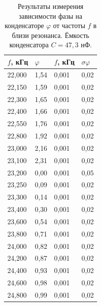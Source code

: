 \documentclass[12pt]{article}
\begin{document}
\begin{table}[H]
    \centering
    \begin{tabular}{|l|l|l|l|}
        \hline
        $f$, кГц & $\varphi$ & $f$, кГц & $\sigma \varphi$ \\ \hline
        22,000   & 1,54      & 0,001    & 0,02             \\ \hline
        22,150   & 1,59      & 0,001    & 0,02             \\ \hline
        22,300   & 1,65      & 0,001    & 0,02             \\ \hline
        22,400   & 1,66      & 0,001    & 0,02             \\ \hline
        22,550   & 1,76      & 0,001    & 0,02             \\ \hline
        22,800   & 1,92      & 0,001    & 0,02             \\ \hline
        23,000   & 2,16      & 0,001    & 0,02             \\ \hline
        23,100   & 2,31      & 0,001    & 0,02             \\ \hline
        23,200   & 0,00      & 0,001    & 0,05             \\ \hline
        23,250   & 0,09      & 0,001    & 0,02             \\ \hline
        23,300   & 0,14      & 0,001    & 0,02             \\ \hline
        23,400   & 0,30      & 0,001    & 0,02             \\ \hline
        23,600   & 0,54      & 0,001    & 0,02             \\ \hline
        23,800   & 0,71      & 0,001    & 0,02             \\ \hline
        24,000   & 0,82      & 0,001    & 0,02             \\ \hline
        24,200   & 0,87      & 0,001    & 0,02             \\ \hline
        24,400   & 0,93      & 0,001    & 0,02             \\ \hline
        24,600   & 0,98      & 0,001    & 0,02             \\ \hline
        24,800   & 0,99      & 0,001    & 0,02             \\ \hline
    \end{tabular}
    \caption{Результаты измерения зависимости фазы на конденсаторе $\varphi$ от частоты $f$ в близи резонанса.
        Ёмкость конденсатора $C = 47,3$ нФ.}
    \label{tab:4}
\end{table}
\end{document}
